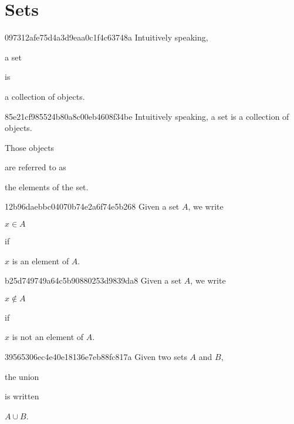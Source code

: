 


\section{Sets}
\begin{note}{097312afe75d4a3d9eaa0c1f4c63748a}
    Intuitively speaking, \begin{icloze}{2}a set\end{icloze} is \begin{icloze}{1}a collection of objects.\end{icloze}
\end{note}

\begin{note}{85e21cf985524b80a8c00eb4608f34be}
    Intuitively speaking, a set is a collection of objects.
    \begin{icloze}{2}Those objects\end{icloze} are referred to as \begin{icloze}{1}the elements of the set.\end{icloze}
\end{note}

\begin{note}{12b96daebbc04070b74e2a6f74e5b268}
    Given a set \({ A }\), we write \begin{icloze}{2}\({ x \in A }\)\end{icloze} if \begin{icloze}{1}\({ x }\) is an element of \({ A }\).\end{icloze}
\end{note}

\begin{note}{b25d749749a64c5b90880253d9839da8}
    Given  a set \({ A }\), we write \begin{icloze}{2}\({ x \not\in A }\)\end{icloze} if \begin{icloze}{1}\({ x }\) is not an element of \({ A }\).\end{icloze}
\end{note}

\begin{note}{39565306ec4e40e18136e7eb88fc817a}
    Given two sets \({ A }\) and \({ B }\), \begin{icloze}{1}the union\end{icloze} is written \begin{icloze}{2}\({ A \cup B }\).\end{icloze}
\end{note}

